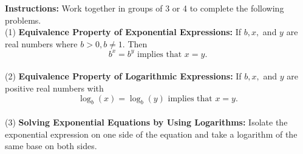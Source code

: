 


\noindent \textbf{Instructions:}  Work together in groups of  3 or 4 to complete the following problems.\\

\noindent (1) \textbf{Equivalence Property of Exponential Expressions:} If $b, x,$ and $y$ are real numbers where $b>0, b \neq 1.$  Then $$b^x=b^y \text{ implies that } x=y.$$  \\

\noindent (2) \textbf{Equivalence Property of Logarithmic Expressions:} If $b, x,$ and $y$ are positive real numbers with $$\log_b (x) = \log_b (y) \text{ implies that } x=y.$$   \\

\noindent (3) \textbf{Solving Exponential Equations by Using Logarithms:}  Isolate the exponential expression on one side of the equation and take a logarithm of the same base on both sides.\\

